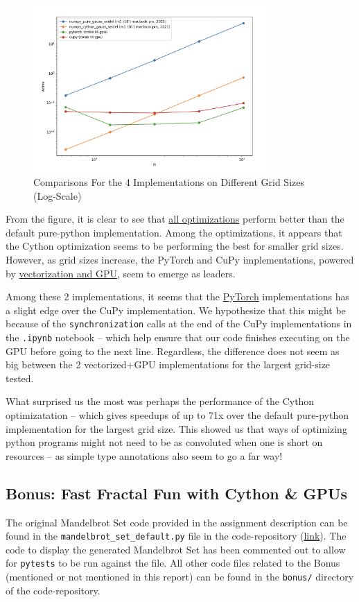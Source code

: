 \documentclass[a4paper,12pt]{article}
\begin{document}
\begin{figure}[H]
  \centering
  \includegraphics[width=0.8\textwidth]{images/ex1_all4_comparison.png}
  \caption{Comparisons For the 4 Implementations on Different Grid Sizes (Log-Scale)}
\end{figure}

From the figure, it is clear to see that \underline{all optimizations} perform better than the default pure-python implementation. Among the optimizations, it appears that the Cython optimization seems to be performing the best for smaller grid sizes. However, as grid sizes increase, the PyTorch and CuPy implementations, powered by \underline{vectorization and GPU}, seem to emerge as leaders. 

Among these 2 implementations, it seems that the \underline{PyTorch} implementations has a slight edge over the CuPy implementation. We hypothesize that this might be because of the \verb|synchronization| calls at the end of the CuPy implementations in the \verb|.ipynb| notebook -- which help ensure that our code finishes executing on the GPU before going to the next line. Regardless, the difference does not seem as big between the 2 vectorized+GPU implementations for the largest grid-size tested. 

What surprised us the most was perhaps the performance of the Cython optimizatation -- which gives speedups of up to 71x over the default pure-python implementation for the largest grid size. This showed us that ways of optimizing python programs might not need to be as convoluted when one is short on resources -- as simple type annotations also seem to go a far way! 

\subsection{Bonus: Fast Fractal Fun with Cython \& GPUs}
The original Mandelbrot Set code provided in the assignment description can be found in the \verb|mandelbrot_set_default.py| file in the code-repository (\href{https://github.com/paulmyr/DD2358-HPC25/blob/master/03_compgpu/bonus/mandelbrot_set_default.py}{link}). The code to display the generated Mandelbrot Set has been commented out to allow for \verb|pytests| to be run against the file. All other code files related to the Bonus (mentioned or not mentioned in this report) can be found in the \verb|bonus/| directory of the code-repository.
\end{document}
